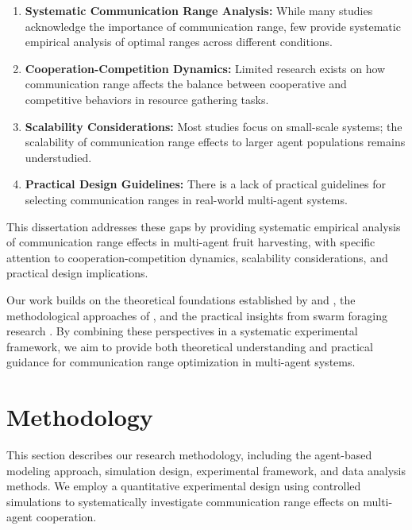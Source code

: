\documentclass[12pt,a4paper]{article}
\begin{document}
\begin{enumerate}
    \item \textbf{Systematic Communication Range Analysis:} While many studies acknowledge the importance of communication range, few provide systematic empirical analysis of optimal ranges across different conditions.

    \item \textbf{Cooperation-Competition Dynamics:} Limited research exists on how communication range affects the balance between cooperative and competitive behaviors in resource gathering tasks.

    \item \textbf{Scalability Considerations:} Most studies focus on small-scale systems; the scalability of communication range effects to larger agent populations remains understudied.

    \item \textbf{Practical Design Guidelines:} There is a lack of practical guidelines for selecting communication ranges in real-world multi-agent systems.
\end{enumerate}

This dissertation addresses these gaps by providing systematic empirical analysis of communication range effects in multi-agent fruit harvesting, with specific attention to cooperation-competition dynamics, scalability considerations, and practical design implications.

Our work builds on the theoretical foundations established by \textcite{jarne2022mean} and \textcite{soma2023congestion}, the methodological approaches of \textcite{barnes2021explaining}, and the practical insights from swarm foraging research \parencite{lu2020swarm, hecker2015beyond}. By combining these perspectives in a systematic experimental framework, we aim to provide both theoretical understanding and practical guidance for communication range optimization in multi-agent systems.

\section{Methodology}
\label{sec:methodology}

This section describes our research methodology, including the agent-based modeling approach, simulation design, experimental framework, and data analysis methods. We employ a quantitative experimental design using controlled simulations to systematically investigate communication range effects on multi-agent cooperation.
\end{document}
